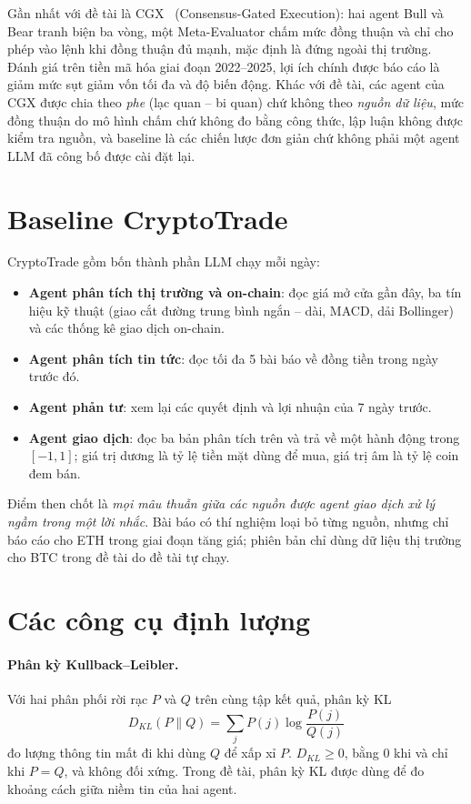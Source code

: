 Gần nhất với đề tài là CGX~\cite{bajgora2026cgx} (Consensus-Gated Execution): hai agent Bull và Bear tranh biện ba vòng,
một Meta-Evaluator chấm mức đồng thuận và chỉ cho phép vào lệnh khi đồng thuận đủ mạnh, mặc định là đứng ngoài thị
trường. Đánh giá trên tiền mã hóa giai đoạn 2022--2025, lợi ích chính được báo cáo là giảm mức sụt giảm vốn tối đa và độ
biến động. Khác với đề tài, các agent của CGX được chia theo \emph{phe} (lạc quan -- bi quan) chứ không theo \emph{nguồn
dữ liệu}, mức đồng thuận do mô hình chấm chứ không đo bằng công thức, lập luận không được kiểm tra nguồn, và baseline là
các chiến lược đơn giản chứ không phải một agent LLM đã công bố được cài đặt lại.

\section{Baseline CryptoTrade}
\label{sec:cryptotrade}
CryptoTrade gồm bốn thành phần LLM chạy mỗi ngày:
\begin{itemize}
  \item \textbf{Agent phân tích thị trường và on-chain}: đọc giá mở cửa gần đây, ba tín hiệu kỹ thuật (giao cắt đường
  trung bình ngắn -- dài, MACD, dải Bollinger) và các thống kê giao dịch on-chain.
  \item \textbf{Agent phân tích tin tức}: đọc tối đa 5 bài báo về đồng tiền trong ngày trước đó.
  \item \textbf{Agent phản tư}: xem lại các quyết định và lợi nhuận của 7 ngày trước.
  \item \textbf{Agent giao dịch}: đọc ba bản phân tích trên và trả về một hành động trong $[-1, 1]$; giá trị dương là
  tỷ lệ tiền mặt dùng để mua, giá trị âm là tỷ lệ coin đem bán.
\end{itemize}
Điểm then chốt là \emph{mọi mâu thuẫn giữa các nguồn được agent giao dịch xử lý ngầm trong một lời nhắc}. Bài báo
có thí nghiệm loại bỏ từng nguồn, nhưng chỉ báo cáo cho ETH trong giai đoạn tăng giá; phiên bản chỉ dùng dữ liệu thị trường cho BTC trong đề tài
do đề tài tự chạy.

\section{Các công cụ định lượng}
\paragraph{Phân kỳ Kullback--Leibler.} Với hai phân phối rời rạc $P$ và $Q$ trên cùng tập kết quả, phân kỳ
KL~\cite{kullback1951}
\begin{equation}
  D_{KL}(P \parallel Q) = \sum_{j} P(j)\log\frac{P(j)}{Q(j)}
\end{equation}
đo lượng thông tin mất đi khi dùng $Q$ để xấp xỉ $P$. $D_{KL} \geq 0$, bằng 0 khi và chỉ khi $P = Q$, và không đối
xứng. Trong đề tài, phân kỳ KL được dùng để đo khoảng cách giữa niềm tin của hai agent.

